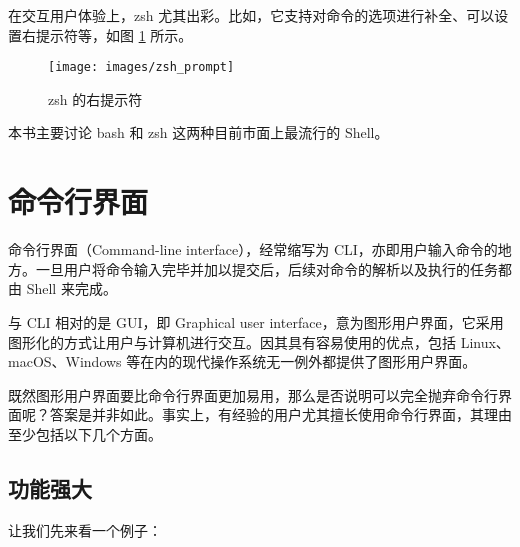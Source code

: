 \documentclass[]{ctexbook}
\newenvironment{Shaded}{\begin{snugshade}}{\end{snugshade}}
\newcommand{\ExtensionTok}[1]{#1}
\newcommand{\FunctionTok}[1]{\textcolor[rgb]{0.00,0.00,0.00}{#1}}
\newcommand{\KeywordTok}[1]{\textcolor[rgb]{0.13,0.29,0.53}{\textbf{#1}}}
\newcommand{\NormalTok}[1]{#1}
\newcommand{\StringTok}[1]{\textcolor[rgb]{0.31,0.60,0.02}{#1}}
\begin{document}
在交互用户体验上，zsh 尤其出彩。比如，它支持对命令的选项进行补全、可以设置右提示符等，如图 \ref{fig:zsh-prompt} 所示。

\begin{figure}
\texttt{[image: images/zsh\_prompt]} \caption{zsh 的右提示符}\label{fig:zsh-prompt}
\end{figure}

本书主要讨论 bash 和 zsh 这两种目前市面上最流行的 Shell。

\hypertarget{ux547dux4ee4ux884cux754cux9762}{%
\section{命令行界面}\label{ux547dux4ee4ux884cux754cux9762}}

命令行界面（Command-line interface），经常缩写为 CLI，亦即用户输入命令的地方。一旦用户将命令输入完毕并加以提交后，后续对命令的解析以及执行的任务都由 Shell 来完成。

与 CLI 相对的是 GUI，即 Graphical user interface，意为图形用户界面，它采用图形化的方式让用户与计算机进行交互。因其具有容易使用的优点，包括 Linux、macOS、Windows 等在内的现代操作系统无一例外都提供了图形用户界面。

既然图形用户界面要比命令行界面更加易用，那么是否说明可以完全抛弃命令行界面呢？答案是并非如此。事实上，有经验的用户尤其擅长使用命令行界面，其理由至少包括以下几个方面。

\hypertarget{ux529fux80fdux5f3aux5927}{%
\subsection{功能强大}\label{ux529fux80fdux5f3aux5927}}

让我们先来看一个例子：

\begin{Shaded}
\end{Shaded}
\end{document}
